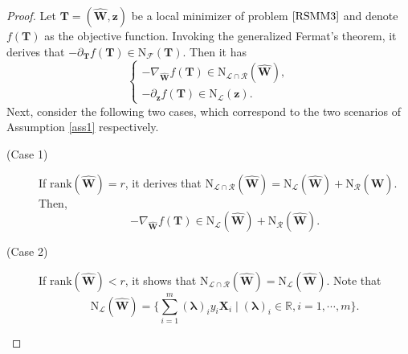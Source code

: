 \documentclass[10pt,a4paper]{amsart}
\begin{document}
\begin{proof}
	Let $\mathbf{T}=(\hat{\mathbf{W}}, \mathbf{z})$ be a local minimizer of  problem $\eqref{RSMM3}$ and denote $f(\mathbf{T})$ as the objective function. Invoking the generalized Fermat's theorem, it derives that  
	$-\partial_\mathbf{T} f(\mathbf{T})\in\mathrm{N}_{\mathcal{F}}(\mathbf{T})$. Then it has
	\begin{equation}\label{T1}
		\begin{cases}
			-\nabla_{\hat{\mathbf{W}}}f(\mathbf{T})\in\mathrm{N}_{\mathcal{L}\cap \mathcal{R}}(\hat{\mathbf{W}}),\\
			-\partial_\mathbf{z} f(\mathbf{T})\in\mathrm{N}_{\mathcal{L}}(\mathbf{z}).
		\end{cases} 
	\end{equation}
Next, consider the following two cases, which correspond to the two scenarios of Assumption \ref{ass1} respectively.
\begin{description}
    \item[(Case 1)] If $\text{rank}(\hat{\mathbf{W}})=r$, it derives that  $\mathrm{N}_{\mathcal{L}\cap \mathcal{R}}(\hat{\mathbf{W}})=\mathrm{N}_{\mathcal{L}}(\hat{\mathbf{W}})+\mathrm{N}_{\mathcal{R}}(\hat{\mathbf{W}})$.  Then,	
\begin{equation*}\label{W1}
		-\nabla_{\hat{\mathbf{W}}} f(\mathbf{T})\in\mathrm{N}_{\mathcal{L}}(\hat{\mathbf{W}})+\mathrm{N}_{\mathcal{R}}(\hat{\mathbf{W}}).
	\end{equation*}

    \item[(Case 2)]     If $\text{rank}(\hat{\mathbf{W}})<r$, it shows that $\mathrm{N}_{\mathcal{L}\cap \mathcal{R}}(\hat{\mathbf{W}})=\mathrm{N}_{\mathcal{L}}(\hat{\mathbf{W}})$. Note that
	\begin{equation*}
		\mathrm{N}_{\mathcal{L}}(\hat{\mathbf{W}})=\{\sum_{i=1}^m(\bm{\lambda})_i y_i\mathbf{X}_i \mid (\bm{\lambda})_i\in\mathbb{R}, i=1,\cdots,m \}.
	\end{equation*}
    

\end{description}
\end{proof}
\end{document}
